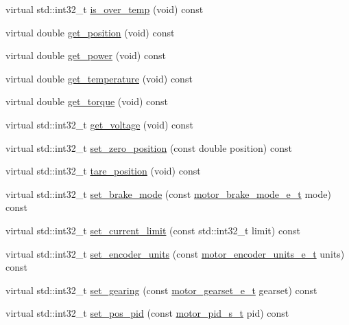 \begin{DoxyCompactItemize}
\item 
virtual std\+::int32\+\_\+t \hyperlink{classpros_1_1Motor_a099d50ed35d73fa29a46b2beb151ce2b}{is\+\_\+over\+\_\+temp} (void) const
\item 
virtual double \hyperlink{classpros_1_1Motor_a70e725a94ec42dc7cbb3e460c36dcad3}{get\+\_\+position} (void) const
\item 
virtual double \hyperlink{classpros_1_1Motor_a51b75dc245257487116e64fa2904d521}{get\+\_\+power} (void) const
\item 
virtual double \hyperlink{classpros_1_1Motor_a9fd793251b91c2ac0091c65f290f740d}{get\+\_\+temperature} (void) const
\item 
virtual double \hyperlink{classpros_1_1Motor_a14e0c57c0ca7bde15f73414abf4c3c8e}{get\+\_\+torque} (void) const
\item 
virtual std\+::int32\+\_\+t \hyperlink{classpros_1_1Motor_abe51732c37c2ec72a8bdceac7f6962cb}{get\+\_\+voltage} (void) const
\item 
virtual std\+::int32\+\_\+t \hyperlink{classpros_1_1Motor_af20c036c1d5d68eb5e762c12f9a4b7fe}{set\+\_\+zero\+\_\+position} (const double position) const
\item 
virtual std\+::int32\+\_\+t \hyperlink{classpros_1_1Motor_a5d67803a65fa699a169a4ed5a107a964}{tare\+\_\+position} (void) const
\item 
virtual std\+::int32\+\_\+t \hyperlink{classpros_1_1Motor_ab51969169dc534537f79710261daa3dd}{set\+\_\+brake\+\_\+mode} (const \hyperlink{motors_8h_aa324a2881696428c9e3684f9ad23a83b}{motor\+\_\+brake\+\_\+mode\+\_\+e\+\_\+t} mode) const
\item 
virtual std\+::int32\+\_\+t \hyperlink{classpros_1_1Motor_a4c496dfb0b33f989d7329a61b7b6d6ba}{set\+\_\+current\+\_\+limit} (const std\+::int32\+\_\+t limit) const
\item 
virtual std\+::int32\+\_\+t \hyperlink{classpros_1_1Motor_a2d2fea8d5967d1e41471111aa89afd84}{set\+\_\+encoder\+\_\+units} (const \hyperlink{motors_8h_a6677ba23760c558fd8b7b4e1e00a6123}{motor\+\_\+encoder\+\_\+units\+\_\+e\+\_\+t} units) const
\item 
virtual std\+::int32\+\_\+t \hyperlink{classpros_1_1Motor_a3adf8b737ad2e4ebb5f000401c536fed}{set\+\_\+gearing} (const \hyperlink{motors_8h_aa2f1c305c998abc3bf8dd1f76fa4da8b}{motor\+\_\+gearset\+\_\+e\+\_\+t} gearset) const
\item 
virtual std\+::int32\+\_\+t \hyperlink{classpros_1_1Motor_a7a42563b94124faebb50e5731d5664ad}{set\+\_\+pos\+\_\+pid} (const \hyperlink{motors_8h_ad2e907c8d7ce53c1fd91f1b9801072e3}{motor\+\_\+pid\+\_\+s\+\_\+t} pid) const

\end{DoxyCompactItemize}
